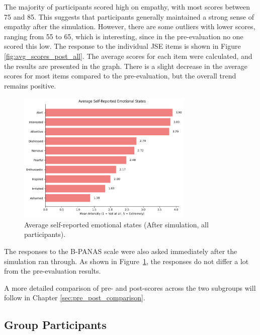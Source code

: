 The majority of participants scored high on empathy, with most scores between 75 and 85. This suggests that participants generally maintained a strong sense of empathy after the simulation. However, there are some outliers with lower scores, ranging from 55 to 65, which is interesting, since in the pre-evaluation no one scored this low. The response to the individual JSE items is shown in Figure \ref{fig:avg_scores_post_all}. The average scores for each item were calculated, and the results are presented in the graph. There is a slight decrease in the average scores for most items compared to the pre-evaluation, but the overall trend remains positive. 

\vspace{1em}

\begin{figure}[htbp]
    \centering
    \includegraphics[width=0.75\textwidth]{../../Figures/emotional-post-all.png}
    \caption{Average self-reported emotional states (After simulation, all participants).}
    \label{fig:emotional_post_all}
\end{figure}

The responses to the B-PANAS scale were also asked immediately after the simulation ran through. As shown in Figure~\ref{fig:emotional_post_all}, the responses do not differ a lot from the pre-evaluation results. 
\vspace{1em}

A more detailed comparison of pre- and post-scores across the two subgroups will follow in Chapter \ref{sec:pre_post_comparison}.

\subsection{Group Participants}

